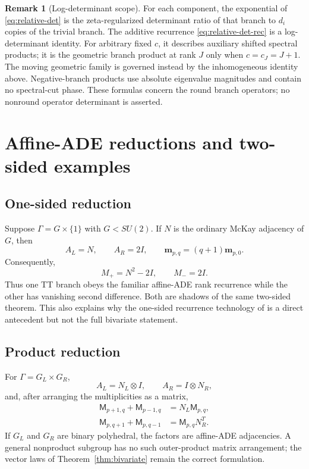 \documentclass[11pt]{article}
\theoremstyle{definition}
\newtheorem{remark}[theorem]{Remark}
\begin{document}
\begin{remark}[Log-determinant scope]
For each component, the exponential of
\eqref{eq:relative-det} is the zeta-regularized determinant ratio of
that branch to $d_i$ copies of the trivial branch.  The additive
recurrence \eqref{eq:relative-det-rec} is a log-determinant identity.
For arbitrary fixed $c$, it describes auxiliary shifted spectral
products; it is the geometric branch product at rank $J$ only when
$c=c_J=J+1$.  The moving geometric family is governed instead by the
inhomogeneous identity above.  Negative-branch products use absolute
eigenvalue magnitudes and contain no spectral-cut phase.  These formulas
concern the round branch operators; no nonround operator determinant is
asserted.
\end{remark}

\section{Affine-ADE reductions and two-sided examples}

\subsection{One-sided reduction}

Suppose $\Gamma=G\times\{1\}$ with $G< SU(2)$.  If $N$ is the
ordinary McKay adjacency of $G$, then
\[
 A_L=N,\qquad A_R=2I,\qquad
 \boldsymbol m_{p,q}=(q+1)\boldsymbol m_{p,0}.
\]
Consequently,
\[
 M_+=N^2-2I,\qquad M_-=2I.
\]
Thus one TT branch obeys the familiar affine-ADE rank recurrence
while the other has vanishing second difference.  Both are shadows
of the same two-sided theorem.  This also explains why the
one-sided recurrence technology of
\cite{Kostant1985,Steinberg1985,Springer1987,Stekolshchik2008,
Suter2007,Benkart2016,JingWangZhang2020,JingWangZhang2021}
is a direct antecedent but not the full bivariate statement.

\subsection{Product reduction}

For $\Gamma=G_L\times G_R$,
\[
 A_L=N_L\otimes I,
 \qquad
 A_R=I\otimes N_R,
\]
and, after arranging the multiplicities as a matrix,
\begin{align*}
 \mathsf M_{p+1,q}+\mathsf M_{p-1,q}
 &=N_L\mathsf M_{p,q},\\
 \mathsf M_{p,q+1}+\mathsf M_{p,q-1}
 &=\mathsf M_{p,q}N_R^T.
\end{align*}
If $G_L$ and $G_R$ are binary polyhedral, the factors are affine-ADE
adjacencies.  A general nonproduct subgroup has no such outer-product
matrix arrangement; the vector laws of
Theorem~\ref{thm:bivariate} remain the correct formulation.
\end{document}
